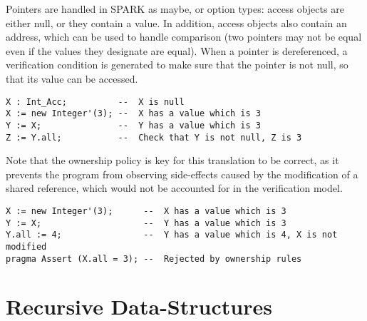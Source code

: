 \documentclass[runningheads]{llncs}
\begin{document}
Pointers are handled in SPARK as maybe, or option types: access objects are either null, or they contain a value. In addition, access objects also contain an address, which can be used to handle comparison (two pointers may not be equal even if the values they designate are equal). When a pointer is dereferenced, a verification condition is generated to make sure that the pointer is not null, so that its value can be accessed.
\begin{lstlisting}
X : Int_Acc;          --  X is null
X := new Integer'(3); --  X has a value which is 3
Y := X;               --  Y has a value which is 3
Z := Y.all;           --  Check that Y is not null, Z is 3
\end{lstlisting}
Note that the ownership policy is key for this translation to be correct, as it prevents the program from observing side-effects caused by the modification of a shared reference, which would not be accounted for in the verification model.
\begin{lstlisting}
X := new Integer'(3);      --  X has a value which is 3
Y := X;                    --  Y has a value which is 3
Y.all := 4;                --  Y has a value which is 4, X is not modified
pragma Assert (X.all = 3); --  Rejected by ownership rules
\end{lstlisting}
\section{Recursive Data-Structures}
\end{document}
